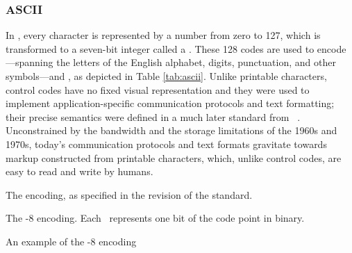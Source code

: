 \subsubsection{ASCII}
In , every character is represented by a number from zero to 127,
which is transformed to a seven-bit integer called a .
These 128 codes are used to encode ---spanning the
letters of the English alphabet, digits, punctuation, and other symbols---and
, as depicted in Table \ref{tab:ascii}.  Unlike printable
characters, control codes have no fixed visual representation and they were used
to implement application-specific communication protocols and text formatting;
their precise semantics were defined in a much later standard from
\citeyear{iso72}~\cite{iso72}. Unconstrained by the bandwidth and the storage
limitations of the 1960s and 1970s, today's communication protocols and text
formats gravitate towards markup constructed from printable characters, which,
unlike control codes, are easy to read and write by humans.

\begin{table}
  
  \caption{The  encoding, as specified in the \citeyear{asa86}
    revision of the standard.~\cite{asa86}}
  \label{tab:ascii}
\end{table}

\begin{table}
  
  \caption{The -8 encoding. Each \textvisiblespace\ represents
    one bit of the  code point in binary.}
  \label{tab:utf8}
\end{table}

\begin{table}
  
  \caption{An example of the -8 encoding}
  \label{tab:utf8-example}
\end{table}


